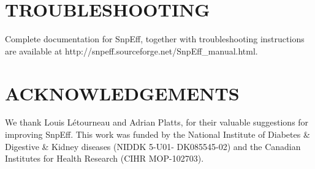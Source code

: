 \section{TROUBLESHOOTING}

Complete documentation for SnpEff, together with troubleshooting instructions are available at http://snpeff.sourceforge.net/SnpEff\_manual.html.

\section{ACKNOWLEDGEMENTS}

We thank Louis Létourneau and Adrian Platts, for their valuable suggestions for improving SnpEff. This work was funded by the National Institute of Diabetes \& Digestive \& Kidney diseases (NIDDK 5-U01- DK085545-02) and the Canadian Institutes for Health Research (CIHR MOP-102703).
